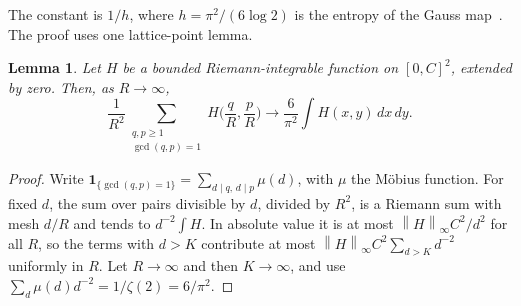 \documentclass[11pt]{article}
\newtheorem{lemma}[theorem]{Lemma}
\theoremstyle{definition}
\theoremstyle{remark}
\newcommand{\one}{\mathbf 1}
\newcommand{\norm}[1]{\left\lVert #1\right\rVert}
\begin{document}
The constant is $1/h$, where $h=\pi^2/(6\log2)$ is the entropy of the
Gauss map~\cite[Section~8.3]{CFV}. The proof uses one lattice-point lemma.

\begin{lemma}\label{lem:coprime}
Let $H$ be a bounded Riemann-integrable function on $[0,C]^2$, extended
by zero. Then, as $R\to\infty$,
\[
 \frac1{R^2}\sum_{\substack{q,p\ge1\\ \gcd(q,p)=1}}H\Big(\frac qR,\frac pR\Big)
 \longrightarrow\frac6{\pi^2}\int H(x,y)\,dx\,dy .
\]
\end{lemma}
\begin{proof}
Write $\one_{\{\gcd(q,p)=1\}}=\sum_{d\mid q,\,d\mid p}\mu(d)$, with $\mu$
the M\"obius function. For fixed $d$, the sum over pairs divisible by $d$,
divided by $R^2$, is a Riemann sum with mesh $d/R$ and tends to
$d^{-2}\int H$. In absolute value it is at most $\norm H_\infty C^2/d^2$ for
all $R$, so the terms with $d>K$ contribute at most
$\norm H_\infty C^2\sum_{d>K}d^{-2}$ uniformly in $R$. Let $R\to\infty$ and
then $K\to\infty$, and use $\sum_d\mu(d)d^{-2}=1/\zeta(2)=6/\pi^2$.
\end{proof}
\end{document}
